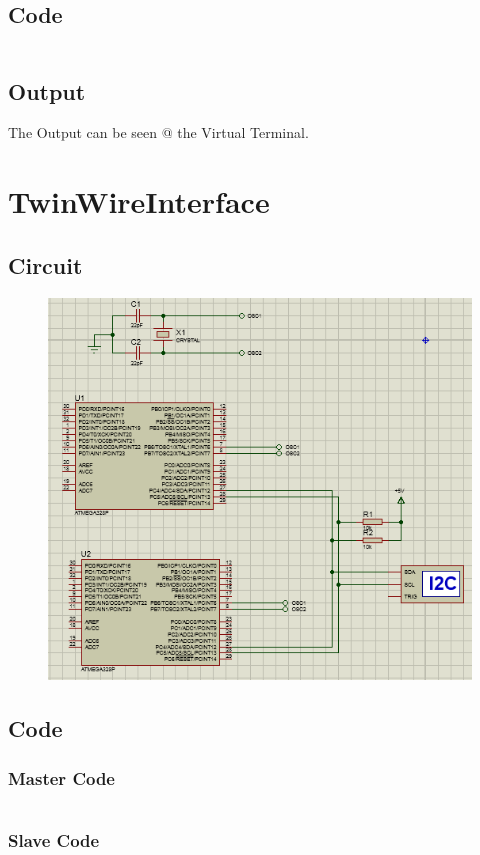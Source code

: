\documentclass[oneside]{book}
\begin{document}
\subsection{Code}
\inputminted[bgcolor=black]{c}{./programFiles/USART0.c}
\subsection{Output}
\quad The Output can be seen @ the Virtual Terminal.


\section{TwinWireInterface}
\subsection{Circuit}
\begin{figure}[H]
    \centering
    \includegraphics[height=0.2\textheight]{TWI.png}
\end{figure}
\subsection{Code}
\subsubsection{Master Code}
\inputminted[bgcolor=black]{c}{./programFiles/I2C_masterMode.c}
\subsubsection{Slave Code}
\inputminted[bgcolor=black]{c}{./programFiles/I2C_slaveMode.c}
\end{document}
